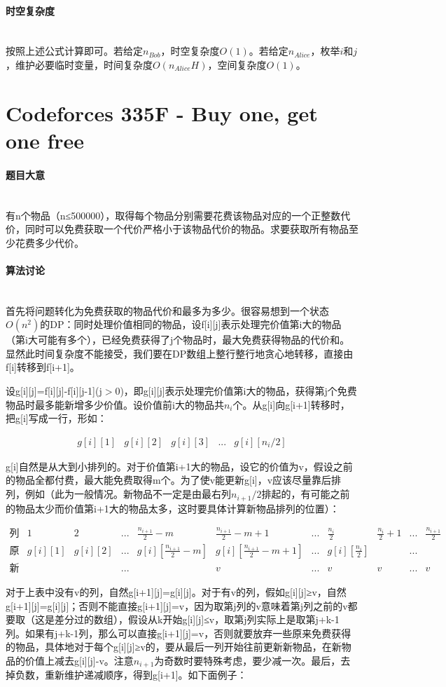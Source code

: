 \documentclass[UTF8]{ctexart}
\newcommand{\myparagraph}[1]{\paragraph{#1}\mbox{}\\}
\theoremstyle{nonumberplain}
\begin{document}
		\myparagraph{时空复杂度}
		
			按照上述公式计算即可。若给定$n_{Bob}$，时空复杂度$O(1)$。若给定$n_{Alice}$，枚举$i$和$j$，维护必要临时变量，时间复杂度$O(n_{Alice}H)$，空间复杂度$O(1)$。
	
	\section{Codeforces 335F - Buy one, get one free}
	
		\myparagraph{题目大意}
			
			有n个物品（n≤500000），取得每个物品分别需要花费该物品对应的一个正整数代价，同时可以免费获取一个代价严格小于该物品代价的物品。求要获取所有物品至少花费多少代价。
			
		\myparagraph{算法讨论}
		
			首先将问题转化为免费获取的物品代价和最多为多少。很容易想到一个状态$O(n^2)$的DP：同时处理价值相同的物品，设f[i][j]表示处理完价值第i大的物品（第i大可能有多个），已经免费获得了j个物品时，最大免费获得物品的代价和。显然此时间复杂度不能接受，我们要在DP数组上整行整行地贪心地转移，直接由f[i]转移到f[i+1]。
			
			设g[i][j]=f[i][j]-f[i][j-1](j$>$0)，即g[i][j]表示处理完价值第i大的物品，获得第j个免费物品时最多能新增多少价值。设价值前i大的物品共$n_i$个。从g[i]向g[i+1]转移时，把g[i]写成一行，形如：
			
			$$ \begin{array}{ccccc} g[i][1] & g[i][2] & g[i][3] & ... & g[i][n_i/2] \end{array} $$
			
			g[i]自然是从大到小排列的。对于价值第i+1大的物品，设它的价值为v，假设之前的物品全都付费，最大能免费取得m个。为了使v能更新g[i]，v应该尽量靠后排列，例如（此为一般情况。新物品不一定是由最右列$n_{i+1}/2$排起的，有可能之前的物品太少而价值第i+1大的物品太多，这时要具体计算新物品排列的位置）：
			
			$$ \begin{array}{lcccccccccc}
				\mbox{列编号} & 1 & 2 & ... & \frac{n_{i+1}}{2}-m & \frac{n_{i+1}}{2}-m+1 & ... & \frac{n_i}{2} & \frac{n_i}{2}+1 & ... & \frac{n_{i+1}}{2} \\
				\mbox{原状态} & g[i][1] & g[i][2] & ... & g[i][\frac{n_{i+1}}{2}-m] & g[i][\frac{n_{i+1}}{2}-m+1] & ... & g[i][\frac{n_i}{2}] & & ... & \\
				\mbox{新物品} & & & ... & & v & ... & v & v & ... & v
			\end{array} $$
			
			对于上表中没有v的列，自然g[i+1][j]=g[i][j]。对于有v的列，假如g[i][j]≥v，自然g[i+1][j]=g[i][j]；否则不能直接g[i+1][j]=v，因为取第j列的v意味着第j列之前的v都要取（这是差分过的数组），假设从k开始g[i][j]≤v，取第j列实际上是取第j+k-1列。如果有j+k-1列，那么可以直接g[i+1][j]=v，否则就要放弃一些原来免费获得的物品，具体地对于每个g[i][j]≥v的，要从最后一列开始往前更新新物品，在新物品的价值上减去g[i][j]-v。注意$n_{i+1}$为奇数时要特殊考虑，要少减一次。最后，去掉负数，重新维护递减顺序，得到g[i+1]。如下面例子：
			
\end{document}
